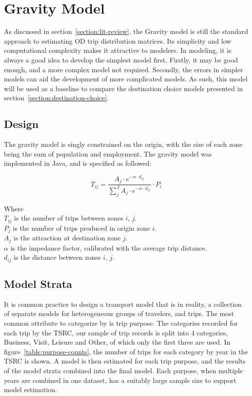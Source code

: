 \chapter{Gravity Model} 
\label{section:gravity-model}
As discussed in section~\ref{section:lit-review}, the Gravity model is still the standard approach to estimating OD trip distribution matrices. Its simplicity and low computational complexity makes it attractive to modelers. In modeling, it is always a good idea to develop the simplest model first. Firstly, it may be good enough, and a more complex model not required. Secondly, the errors in simpler models can aid the development of more complicated models. As such, this model will be used as a baseline to compare the destination choice models presented in section~\ref{section:destination-choice}.

\section{Design}
The gravity model is singly constrained on the origin, with the size of each zone being the sum of population and employment. The gravity model was implemented in Java, and is specified as followed:

$$ 
T_{ij} = \frac{A_j \cdot e^{-\alpha \cdot d_{ij}}}{\sum_j^J A_j \cdot e^{-\alpha \cdot d_{ij}}} \cdot P_i $$

Where \\
$T_{ij}$ is the number of trips between zones $i$, $j$. \\
$P_j$ is the number of trips produced in origin zone $i$.\\
$A_j$ is the attraction at destination zone $j$.\\
$\alpha$ is the impedance factor, calibrated with the average trip distance.\\
$d_{ij}$ is the distance between zones $i$, $j$.\\

\section{Model Strata}
It is common practice to design a transport model that is in reality, a collection of separate models for heterogeneous groups of travelers, and trips. The most common attribute to categorize by is trip purpose. The categories recorded for each trip by the TSRC, our sample of trip records is split into 4 categories, Business, Visit, Leisure and Other, of which only the first three are used. In figure~\ref{table:purpose-counts}, the number of trips for each category by year in the TSRC is shown. A model is then estimated for each trip purpose, and the results of the model strata combined into the final model. Each purpose, when multiple years are combined in one dataset, has a suitably large sample size to support model estimation. 

